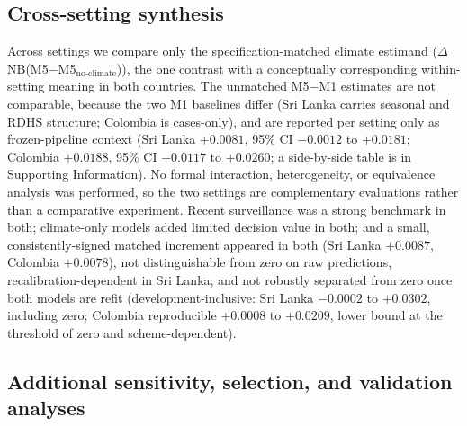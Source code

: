 \documentclass[11pt,a4paper]{article}
\begin{document}
\subsection{Cross-setting synthesis}
Across settings we compare only the specification-matched climate estimand ($\Delta$NB(M5$-$M5$_{\text{no-climate}}$)), the one contrast with a conceptually corresponding within-setting meaning in both countries. The unmatched M5$-$M1 estimates are not comparable, because the two M1 baselines differ (Sri Lanka carries seasonal and RDHS structure; Colombia is cases-only), and are reported per setting only as frozen-pipeline context (Sri Lanka $+0.0081$, 95\% CI $-0.0012$ to $+0.0181$; Colombia $+0.0188$, 95\% CI $+0.0117$ to $+0.0260$; a side-by-side table is in Supporting Information). No formal interaction, heterogeneity, or equivalence analysis was performed, so the two settings are complementary evaluations rather than a comparative experiment. Recent surveillance was a strong benchmark in both; climate-only models added limited decision value in both; and a small, consistently-signed matched increment appeared in both (Sri Lanka $+0.0087$, Colombia $+0.0078$), not distinguishable from zero on raw predictions, recalibration-dependent in Sri Lanka, and not robustly separated from zero once both models are refit (development-inclusive: Sri Lanka $-0.0002$ to $+0.0302$, including zero; Colombia reproducible $+0.0008$ to $+0.0209$, lower bound at the threshold of zero and scheme-dependent).


\subsection{Additional sensitivity, selection, and validation analyses}
\end{document}
